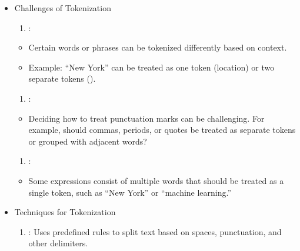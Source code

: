 \documentclass[letterpaper,11pt,english]{sphinxmanual}
\begin{document}
\begin{itemize}
\begin{itemize}
\end{itemize}

\item {} 
\sphinxAtStartPar
Challenges of Tokenization
\begin{enumerate}
%
\item {} 
\sphinxAtStartPar
{}:

\end{enumerate}
\begin{itemize}
\item {} 
\sphinxAtStartPar
Certain words or phrases can be tokenized differently based on context.

\item {} 
\sphinxAtStartPar
Example: “New York” can be treated as one token (location) or two separate tokens ().

\end{itemize}
\begin{enumerate}
%
\setcounter{enumi}{1}
\item {} 
\sphinxAtStartPar
{}:

\end{enumerate}
\begin{itemize}
\item {} 
\sphinxAtStartPar
Deciding how to treat punctuation marks can be challenging. For example, should commas, periods,
or quotes be treated as separate tokens or grouped with adjacent words?

\end{itemize}
\begin{enumerate}
%
\setcounter{enumi}{2}
\item {} 
\sphinxAtStartPar
{}:

\end{enumerate}
\begin{itemize}
\item {} 
\sphinxAtStartPar
Some expressions consist of multiple words that should be treated as a single token, such as “New York” or “machine learning.”

\end{itemize}

\item {} 
\sphinxAtStartPar
Techniques for Tokenization
\begin{enumerate}
%
\item {} 
\sphinxAtStartPar
{}: Uses predefined rules to split text based on spaces, punctuation, and other delimiters.


\end{enumerate}
\end{itemize}
\end{document}
